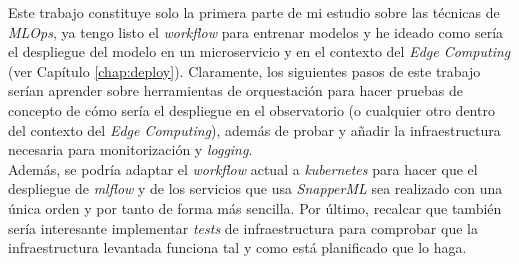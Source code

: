 Este trabajo constituye solo la primera parte de mi estudio sobre las técnicas de \textit{MLOps}, ya tengo listo el \textit{workflow} para entrenar modelos y he ideado como sería el despliegue del modelo en un microservicio y en el contexto del \textit{Edge Computing} (ver Capítulo \ref{chap:deploy}). Claramente, los siguientes pasos de este trabajo serían aprender sobre herramientas de orquestación para hacer pruebas de concepto de cómo sería el despliegue en el observatorio (o cualquier otro dentro del contexto del \textit{Edge Computing}), además de probar y añadir la infraestructura necesaria para monitorización y \textit{logging}.\\

Además, se podría adaptar el \textit{workflow} actual a \textit{kubernetes} para hacer que el despliegue de \textit{mlflow} y de los servicios que usa \textit{SnapperML} sea realizado con una única orden y por tanto de forma más sencilla. Por último, recalcar que también sería interesante implementar \textit{tests} de infraestructura para comprobar que la infraestructura levantada funciona tal y como está planificado que lo haga.\\
